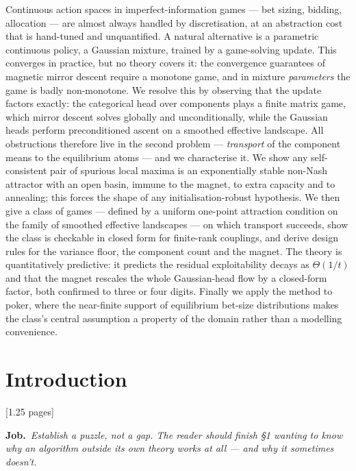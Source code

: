 \documentclass[11pt]{article}
\newcommand{\job}[1]{\par\smallskip\noindent
  \textcolor{jobc}{\textbf{Job.}}\ \emph{#1}\par\smallskip}
\newcommand{\budget}[1]{\hfill{\small\textsf{[#1]}}}
\theoremstyle{definition}
\theoremstyle{remark}
\begin{document}
\noindent
Continuous action spaces in imperfect-information games --- bet sizing, bidding,
allocation --- are almost always handled by discretisation, at an abstraction cost
that is hand-tuned and unquantified. A natural alternative is a parametric
continuous policy, a Gaussian mixture, trained by a game-solving update. This
converges in practice, but no theory covers it: the convergence guarantees of
magnetic mirror descent require a monotone game, and in mixture \emph{parameters}
the game is badly non-monotone. We resolve this by observing that the update
factors exactly: the categorical head over components plays a finite matrix game,
which mirror descent solves globally and unconditionally, while the Gaussian
heads perform preconditioned ascent on a smoothed effective landscape. All
obstructions therefore live in the second problem --- \emph{transport} of the
component means to the equilibrium atoms --- and we characterise it. We show any
self-consistent pair of spurious local maxima is an exponentially stable non-Nash
attractor with an open basin, immune to the magnet, to extra capacity and to
annealing; this forces the shape of any initialisation-robust hypothesis. We then
give a class of games --- defined by a uniform one-point attraction condition on
the family of smoothed effective landscapes --- on which transport succeeds, show
the class is checkable in closed form for finite-rank couplings, and derive
design rules for the variance floor, the component count and the magnet. The
theory is quantitatively predictive: it predicts the residual exploitability
decays as $\Theta(1/t)$ and that the magnet rescales the whole Gaussian-head flow
by a closed-form factor, both confirmed to three or four digits. Finally we apply
the method to poker, where the near-finite support of equilibrium bet-size
distributions makes the class's central assumption a property of the domain
rather than a modelling convenience.

\section{Introduction}\label{sec:intro}
\budget{1.25 pages}

\job{Establish a \emph{puzzle}, not a gap. The reader should finish \S1 wanting
to know why an algorithm outside its own theory works at all --- and why it
sometimes doesn't.}
\end{document}
